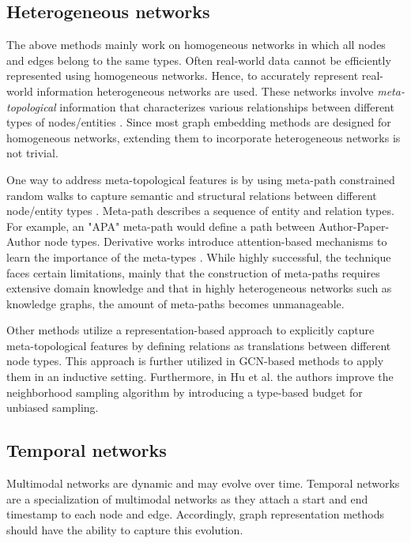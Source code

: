 \subsection{Heterogeneous networks}
The above methods mainly work on homogeneous networks in which all nodes and edges belong to the same types. %
Often real-world data cannot be efficiently represented using homogeneous networks. 
Hence, to accurately represent real-world information heterogeneous networks are used. 
These networks involve \textit{meta-topological} information that characterizes various relationships between different types of nodes/entities \cite{yangHeterogeneousNetworkRepresentation2020}. 
Since most graph embedding methods are designed for homogeneous networks, extending them to incorporate heterogeneous networks is not trivial.

One way to address meta-topological features is by using meta-path constrained random walks to capture semantic and structural relations between different node/entity types \cite{dongMetapath2vecScalableRepresentation2017, fuHIN2VecExploreMetapaths2017}. Meta-path describes a sequence of entity and relation types. For example, an "APA" meta-path would define a path between Author-Paper-Author node types. 
Derivative works introduce attention-based mechanisms to learn the importance of the meta-types \cite{wangHeterogeneousGraphAttention2019}.
While highly successful, the technique faces certain limitations, mainly that the construction of meta-paths requires extensive domain knowledge and that in highly heterogeneous networks such as knowledge graphs, the amount of meta-paths becomes unmanageable.

Other methods utilize a representation-based approach \cite{bordesTranslatingEmbeddingsModeling2013, wangKnowledgeGraphEmbedding2014} to explicitly capture meta-topological features by defining relations as translations between different node types. 
This approach is further utilized in GCN-based methods \cite{huHeterogeneousGraphTransformer2020, zhaoDeepAdversarialCompletion2020} to apply them in an inductive setting.
% 
Furthermore, in Hu et al. \cite{huHeterogeneousGraphTransformer2020} the authors improve the neighborhood sampling algorithm by introducing a type-based budget for unbiased sampling.

\subsection{Temporal networks}
Multimodal networks are dynamic and may evolve over time. %
Temporal networks are a specialization of multimodal networks as they attach a start and end timestamp to each node and edge. Accordingly, graph representation methods should have the ability to capture this evolution.

